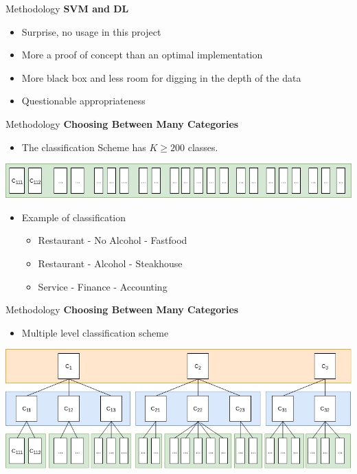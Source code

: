 \begin{frame}[label=metho]{Methodology}
	\textbf{SVM and DL}
	\begin{itemize}
		\item Surprise, no usage in this project
		\item More a proof of concept than an optimal implementation
		\item More black box and less room for digging in the depth of the data
		\item Questionable appropriateness
	\end{itemize}
\end{frame}


\begin{frame}[label=metho]{Methodology}
	\textbf{Choosing Between Many Categories}
	\begin{itemize}
		\item The classification Scheme has $K \geq 200$ classes.
	\end{itemize}

\includegraphics[width=\textwidth]{images/bottom_level.png}
	
	\begin{itemize}
	\item Example of classification
\begin{itemize}
	\item Restaurant - No Alcohol - Fastfood
	\item Restaurant - Alcohol - Steakhouse
	\item Service - Finance - Accounting
\end{itemize}
\end{itemize}



\end{frame}


\begin{frame}[label=metho]{Methodology}
	\textbf{Choosing Between Many Categories}
	\begin{itemize}
		\item Multiple level classification scheme 
	\end{itemize}
	
	\includegraphics[width=\textwidth]{images/hierarchical_classification.png}
	

\end{frame}


